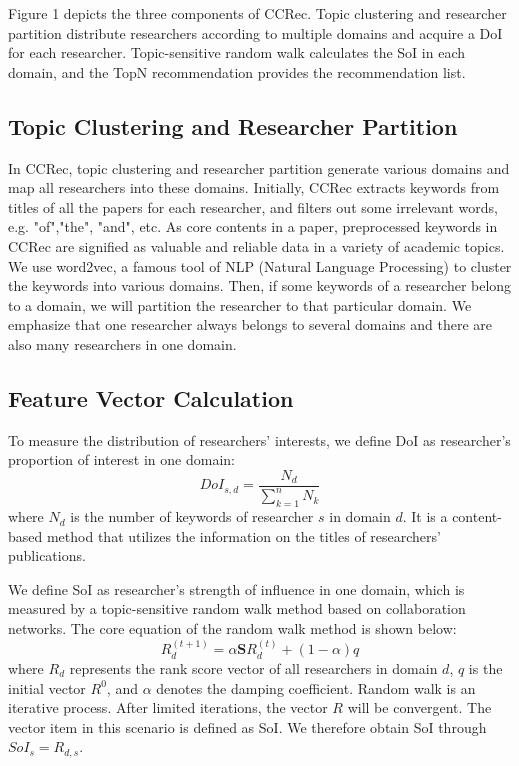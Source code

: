 \documentclass{acm_proc_article-sp}
\begin{document}
Figure 1 depicts the three components of CCRec. Topic clustering and researcher partition distribute researchers according to multiple domains and acquire a DoI for each researcher. Topic-sensitive random walk calculates the SoI in each domain, and the TopN recommendation provides the recommendation list.

\subsection{Topic Clustering and Researcher Partition}
In CCRec, topic clustering and researcher partition generate various domains and map all researchers into these domains. Initially, CCRec extracts keywords from titles of all the papers for each researcher, and filters out some irrelevant words, e.g. "of","the", "and", etc. As core contents in a paper, preprocessed keywords in CCRec are signified as valuable and reliable data in a variety of academic topics. We use word2vec, a famous tool of NLP (Natural Language Processing) to cluster the keywords into various domains. Then, if some keywords of a researcher belong to a domain, we will partition the researcher to that particular domain. We emphasize that one researcher always belongs to several domains and there are also many researchers in one domain.

\subsection{Feature Vector Calculation}
To measure the distribution of researchers' interests, we define DoI as researcher's proportion of interest in one domain:
\begin{equation}
DoI_{s,d}=\frac{N_{d}}{\sum_{k=1}^{n} N_{k}}
\end{equation}
where $N_{d}$ is the number of keywords of researcher $s$ in domain $d$. It is a content-based method that utilizes the information on the titles of researchers' publications.

We define SoI as researcher's strength of influence in one domain, which is measured by a topic-sensitive random walk method based on collaboration networks. The core equation of the random walk method is shown below:
\begin{equation}
R_{d}^{(t+1)}=\alpha \mathbf{S}R_{d}^{(t)}+(1-\alpha)q
\end{equation}
where $R_{d}$ represents the rank score vector of all researchers in domain $d$, $q$ is the initial vector $R^0$, and $\alpha$ denotes the damping coefficient. Random walk is an iterative process. After limited iterations, the vector $R$ will be convergent. The vector item in this scenario is defined as SoI. We therefore obtain SoI through $SoI_{s}=R_{d,s}$.
\end{document}
